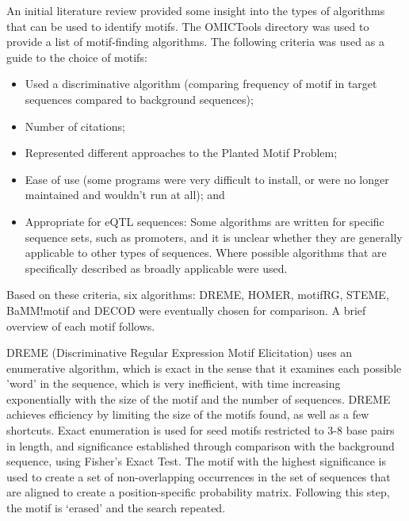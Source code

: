 \documentclass[12pt]{article}
\begin{document}
An initial literature review provided some insight into the types of algorithms that can be used to identify motifs. The OMICTools directory \citep{henry2014omictools} was used to provide a list of motif-finding algorithms. The following criteria was used as a guide to the choice of motifs:
\begin{itemize}
\item Used a discriminative algorithm (comparing frequency of motif in target sequences compared to background sequences);
\item Number of citations;
\item Represented different approaches to the Planted Motif Problem;
\item Ease of use (some programs were very difficult to install, or were no longer maintained and wouldn't run at all); and
\item Appropriate for eQTL sequences: Some algorithms are written for specific sequence sets, such as promoters, and it is unclear whether they are generally applicable to other types of sequences. Where possible algorithms that are specifically described as broadly applicable were used.
\end{itemize}

Based on these criteria, six algorithms: DREME, HOMER, motifRG, STEME, BaMM!motif and DECOD were eventually chosen for comparison. A brief overview of each motif follows.


DREME (Discriminative Regular Expression Motif Elicitation) \citep{bailey2011dreme} uses an enumerative algorithm, which is exact in the sense that it examines each possible 'word' in the sequence, which is very inefficient, with time increasing exponentially with the size of the motif and the number of sequences. DREME achieves efficiency by limiting the size of the motifs found, as well as a few shortcuts. Exact enumeration is used for seed motifs restricted to 3-8 base pairs in length, and significance established through comparison with the background sequence, using Fisher's Exact Test. The motif with the highest significance is used to create a set of non-overlapping occurrences in the set of sequences that are aligned to create a position-specific probability matrix. Following this step, the motif is `erased' and the search repeated.
 
\end{document}
